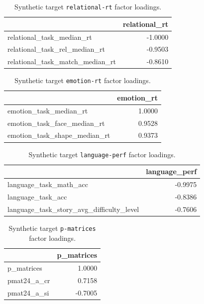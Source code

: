 \documentclass{article}
\begin{document}
\begin{table}[H]
\centering
\begin{tabular}{lr}
\toprule
 & relational\_rt \\
\midrule
relational\_task\_median\_rt & -1.0000 \\
relational\_task\_rel\_median\_rt & -0.9503 \\
relational\_task\_match\_median\_rt & -0.8610 \\
\bottomrule
\end{tabular}

\footnotesize
\caption{Synthetic target \texttt{relational-rt} factor loadings.}
\normalsize
\label{tab:relational-rt}
\end{table}


\begin{table}[H]
\centering
\begin{tabular}{lr}
\toprule
 & emotion\_rt \\
\midrule
emotion\_task\_median\_rt & 1.0000 \\
emotion\_task\_face\_median\_rt & 0.9528 \\
emotion\_task\_shape\_median\_rt & 0.9373 \\
\bottomrule
\end{tabular}

\footnotesize
\caption{Synthetic target \texttt{emotion-rt} factor loadings.}
\normalsize
\label{tab:emotion-rt}
\end{table}


\begin{table}[H]
\centering
\begin{tabular}{lr}
\toprule
 & language\_perf \\
\midrule
language\_task\_math\_acc & -0.9975 \\
language\_task\_acc & -0.8386 \\
language\_task\_story\_avg\_difficulty\_level & -0.7606 \\
\bottomrule
\end{tabular}

\footnotesize
\caption{Synthetic target \texttt{language-perf} factor loadings.}
\normalsize
\label{tab:language-perf}
\end{table}


\begin{table}[H]
\centering
\begin{tabular}{lr}
\toprule
 & p\_matrices \\
\midrule
p\_matrices & 1.0000 \\
pmat24\_a\_cr & 0.7158 \\
pmat24\_a\_si & -0.7005 \\
\bottomrule
\end{tabular}

\footnotesize
\caption{Synthetic target \texttt{p-matrices} factor loadings.}
\normalsize
\label{tab:p-matrices}
\end{table}
\end{document}
